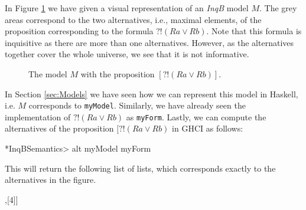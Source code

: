 In Figure \ref{fig:Example Model} we have given a visual representation of an \textit{InqB} model $M$. The grey areas correspond to the two alternatives, i.e., maximal elements, of the proposition corresponding to the formula $?!(Ra \lor Rb)$. Note that this formula is inquisitive as there are more than one alternatives. However, as the alternatives together cover the whole universe, we see that it is not informative.

\begin{figure}[h]
    \centering
    \caption{The model $M$ with the proposition $[?!(Ra \lor Rb)]$.}
    \label{fig:Example Model}
\end{figure}

\noindent In Section \ref{sec:Models} we have seen how we can represent this model in Haskell, i.e. $M$ corresponds to \verb|myModel|. Similarly, we have already seen the implementation of $?!(Ra \lor Rb)$ as \verb|myForm|. Lastly, we can compute the alternatives of the proposition $[?!(Ra \lor Rb)$ in GHCI as follows:
\begin{showCode}
*InqBSemantics> alt myModel myForm
\end{showCode}
\noindent This will return the following list of lists, which corresponds exactly to the alternatives in the figure.
\begin{showCode}
[[1,2,3],[4]]
\end{showCode}